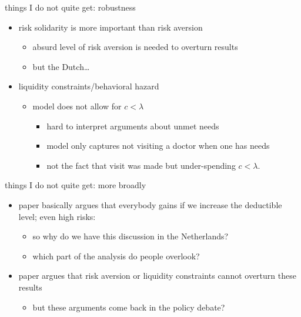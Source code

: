 \documentclass[presentation]{beamer}
\begin{document}
\begin{frame}[label={sec:org062682c}]{things I do not quite get: robustness}
\begin{itemize}
\item risk solidarity is more important than risk aversion
\begin{itemize}
\item absurd level of risk aversion is needed to overturn results
\item but the Dutch\ldots{}
\end{itemize}
\item liquidity constraints/behavioral hazard
\begin{itemize}
\item model does not allow for \(c < \lambda\)
\begin{itemize}
\item hard to interpret arguments about unmet needs
\item model only captures not visiting a doctor when one has needs
\item not the fact that visit was made but under-spending \(c < \lambda\).
\end{itemize}
\end{itemize}
\end{itemize}
\end{frame}

\begin{frame}[label={sec:orge11f7b3}]{things I do not quite get: more broadly}
\begin{itemize}
\item paper basically argues that everybody gains if we increase the deductible level; even high risks:
\begin{itemize}
\item so why do we have this discussion in the Netherlands?
\item which part of the analysis do people overlook?
\end{itemize}
\item paper argues that risk aversion or liquidity constraints cannot overturn these results
\begin{itemize}
\item but these arguments come back in the policy debate?
\end{itemize}
\end{itemize}
\end{frame}
\end{document}
